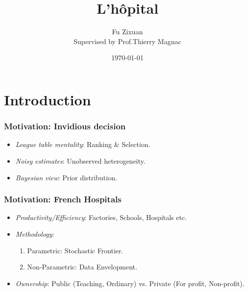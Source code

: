 \documentclass[10pt,mathserif]{beamer}
\title{\large \bfseries L'hôpital}
\author{Fu Zixuan\\[3ex]
  Supervised by Prof.Thierry Magnac}
\date{\today}
\begin{document}
\frame{
  \thispagestyle{empty}
  \titlepage
}

\section{Introduction}

\begin{frame}
  \frametitle{Motivation: Invidious decision}
  \begin{itemize}
    \item \textit{League table mentality}: Ranking & Selection.
    \item \textit{Noisy estimates}: Unobserved heterogeneity.
    \item \textit{Bayesian view}: Prior distribution.
  \end{itemize}
\end{frame}

\begin{frame}
  \frametitle{Motivation: French Hospitals}
  \begin{itemize}
    \item \textit{Productivity/Efficiency}: Factories, Schools, Hospitals etc.
    \item \textit{Methodology}:
          \begin{enumerate}
            \item Parametric: Stochastic Frontier.
            \item Non-Parametric: Data Envelopment.
          \end{enumerate}
    \item \textit{Ownership}: Public (Teaching, Ordinary) vs. Private (For profit, Non-profit).
  \end{itemize}
\end{frame}
\end{document}
